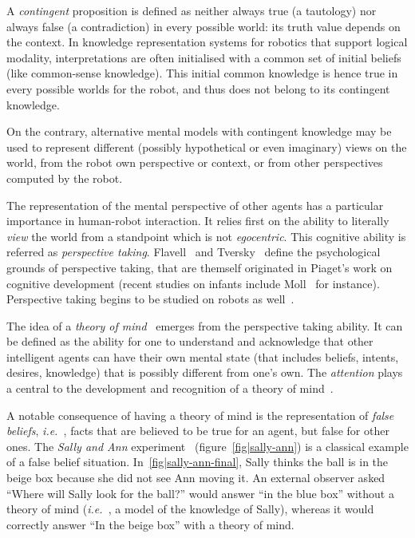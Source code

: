 \documentclass[a4paper, twocolumn]{article}
\newcommand{\ie}{{\textit{i.e.\ }}}
\begin{document}
A \emph{contingent} proposition is defined as neither always true (a tautology)
nor always false (a contradiction) in every possible world: its truth value
depends on the context. In knowledge representation systems for robotics that
support logical modality, interpretations are often initialised with a common
set of initial beliefs (like common-sense knowledge). This initial common
knowledge is hence true in every possible worlds for the robot, and thus does
not belong to its contingent knowledge.

On the contrary, alternative mental models with contingent knowledge may be
used to represent different (possibly hypothetical or even imaginary) views on
the world, from the robot own perspective or context, or from other
perspectives computed by the robot.

The representation of the mental perspective of other agents has a particular
importance in human-robot interaction. It relies first on the ability to
literally \emph{view} the world from a standpoint which is not
\emph{egocentric}. This cognitive ability is referred as \emph{perspective
taking}. Flavell~\cite{Flavell1992} and Tversky~\cite{Tversky1999} define the
psychological grounds of perspective taking, that are themself originated in
Piaget's work on cognitive development (recent studies on infants include
Moll~\cite{Moll2006} for instance). Perspective taking begins to be studied on
robots as well~\cite{Trafton2005, Breazeal2006, Ros2010}.

The idea of a \emph{theory of mind}~\cite{Premack1978} emerges from the
perspective taking ability. It can be defined as the ability for one to
understand and acknowledge that other intelligent agents can have their own
mental state (that includes beliefs, intents, desires, knowledge) that is
possibly different from one's own. The \emph{attention} plays a central to the
development and recognition of a theory of mind~\cite{Baron-Cohen1985,
Leslie2000}.

A notable consequence of having a theory of mind is the representation of
\emph{false beliefs}, \ie, facts that are believed to be true for an agent, but
false for other ones. The \emph{Sally and Ann} experiment~\cite{Leslie2000}
(figure~\ref{fig|sally-ann}) is a classical example of a false belief
situation. In~\ref{fig|sally-ann-final}, Sally thinks the ball is in the beige
box because she did not see Ann moving it. An external observer asked ``Where
will Sally look for the ball?'' would answer ``in the blue box'' without a
theory of mind (\ie, a model of the knowledge of Sally), whereas it would
correctly answer ``In the beige box'' with a theory of mind.
\end{document}

